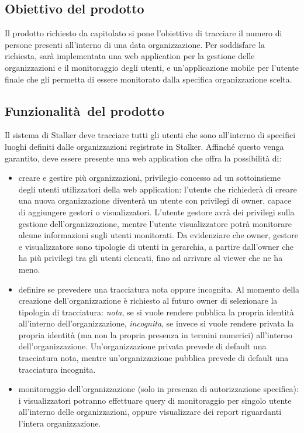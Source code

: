 \documentclass[../manuale-utente.tex]{subfiles}
\begin{document}
\subsection{Obiettivo del prodotto}%
\label{sub:obiettivo_del_prodotto}
Il prodotto richiesto da capitolato si pone l'obiettivo di tracciare il numero di persone presenti all'interno di una data organizzazione. Per soddisfare la richiesta, sarà implementata una web application per la gestione delle organizzazioni e il monitoraggio degli utenti, e un'applicazione mobile per l'utente finale che gli permetta di essere monitorato dalla specifica organizzazione scelta.


\subsection{Funzionalità del prodotto}%
\label{sub:funzionalita_del_prodotto}
Il sistema di Stalker deve tracciare tutti gli utenti che sono all'interno di specifici luoghi definiti dalle organizzazioni registrate in Stalker.
Affinché questo venga garantito, deve essere presente una web application che offra la possibilità di:
\begin{itemize}
  \item creare e gestire più organizzazioni, privilegio concesso ad un sottoinsieme degli utenti utilizzatori della web application: l'utente che richiederà di creare una nuova organizzazione diventerà un utente con privilegi di owner, capace di aggiungere gestori o visualizzatori. L'utente gestore avrà dei privilegi sulla gestione dell'organizzazione, mentre l'utente visualizzatore potrà monitorare alcune informazioni sugli utenti monitorati. Da evidenziare che owner, gestore e visualizzatore sono tipologie di utenti in gerarchia, a partire dall'owner che ha più privilegi tra gli utenti elencati, fino ad arrivare al viewer che ne ha meno.
  \item definire se prevedere una tracciatura nota oppure incognita. Al momento della creazione dell'organizzazione è richiesto al futuro owner di selezionare la tipologia di tracciatura: \textit{nota}, se si vuole rendere pubblica la propria identità all'interno dell'organizzazione, \textit{incognita}, se invece si vuole rendere privata la propria identità (ma non la propria presenza in termini numerici) all'interno dell'organizzazione. Un'organizzazione privata prevede di default una tracciatura nota, mentre un'organizzazione pubblica prevede di default una tracciatura incognita.
  \item monitoraggio dell'organizzazione (solo in presenza di autorizzazione specifica): i visualizzatori potranno effettuare query di monitoraggio per singolo utente all'interno delle organizzazioni, oppure visualizzare dei report riguardanti l'intera organizzazione.
\end{itemize}
\end{document}
